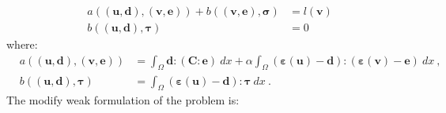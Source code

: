 \documentclass[preprint,12pt,authoryear]{elsarticle}
\begin{document}
\begin{eqnarray}
& a( (\bm{u},\bm{d}), (\bm{v}, \bm{e}) ) 
+ b( (\bm{v}, \bm{e}), \bm{\sigma} ) &= l(\bm{v}) \\
& b( (\bm{u},\bm{d}), \bm{\tau} )                                 &= 0
\end{eqnarray}
where:
\begin{eqnarray}
& a( (\bm{u},\bm{d}), (\bm{v}, \bm{e}) ) 
&= \int_{\Omega} \bm{d} : (\bm{C}:\bm{e}) \: dx 
+ \alpha \int_{\Omega} (\bm{\varepsilon}(\bm{u}) 
- \bm{d}):(\bm{\varepsilon}(\bm{v}) - \bm{e}) \: dx \:, \\
& b( (\bm{u},\bm{d}), \bm{\tau} ) &= 
\int_{\Omega} (\bm{\varepsilon}(\bm{u}) - \bm{d}) : \bm{\tau} \: dx \:.
\end{eqnarray}
The modify weak formulation of the problem is:
\end{document}
